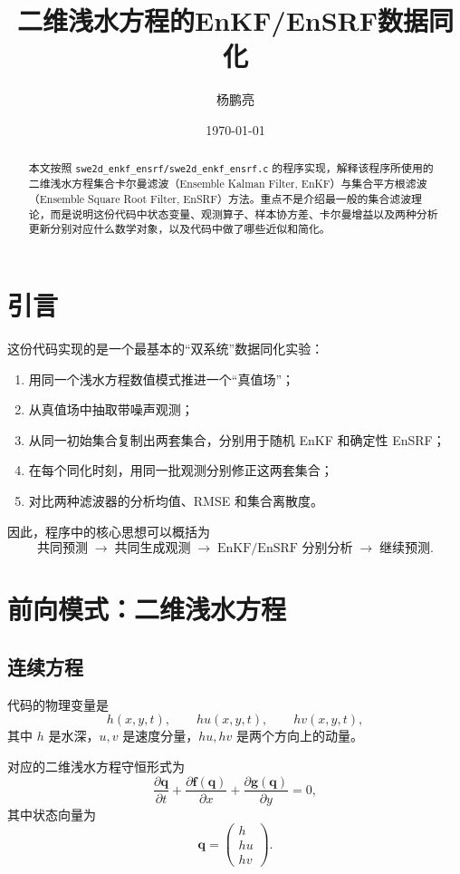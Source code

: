 \documentclass[12pt,a4paper]{article}
\title{二维浅水方程的EnKF/EnSRF数据同化}
\author{杨鹏亮}
\date{\today}
\begin{document}
\maketitle

\begin{abstract}
本文按照 \texttt{swe2d\_enkf\_ensrf/swe2d\_enkf\_ensrf.c} 的程序实现，解释该程序所使用的二维浅水方程集合卡尔曼滤波（Ensemble Kalman Filter, EnKF）与集合平方根滤波（Ensemble Square Root Filter, EnSRF）方法。重点不是介绍最一般的集合滤波理论，而是说明这份代码中状态变量、观测算子、样本协方差、卡尔曼增益以及两种分析更新分别对应什么数学对象，以及代码中做了哪些近似和简化。
\end{abstract}

\tableofcontents

\section{引言}

这份代码实现的是一个最基本的“双系统”数据同化实验：
\begin{enumerate}
    \item 用同一个浅水方程数值模式推进一个“真值场”；
    \item 从真值场中抽取带噪声观测；
    \item 从同一初始集合复制出两套集合，分别用于随机 EnKF 和确定性 EnSRF；
    \item 在每个同化时刻，用同一批观测分别修正这两套集合；
    \item 对比两种滤波器的分析均值、RMSE 和集合离散度。
\end{enumerate}

因此，程序中的核心思想可以概括为
\[
\text{共同预测} \;\to\; \text{共同生成观测} \;\to\; \text{EnKF/EnSRF 分别分析} \;\to\; \text{继续预测}.
\]

\section{前向模式：二维浅水方程}

\subsection{连续方程}

代码的物理变量是
\[
h(x,y,t), \qquad hu(x,y,t), \qquad hv(x,y,t),
\]
其中 $h$ 是水深，$u,v$ 是速度分量，$hu,hv$ 是两个方向上的动量。

对应的二维浅水方程守恒形式为
\[
\frac{\partial \mathbf{q}}{\partial t}
+ \frac{\partial \mathbf{f}(\mathbf{q})}{\partial x}
+ \frac{\partial \mathbf{g}(\mathbf{q})}{\partial y}
= 0,
\]
其中状态向量为
\[
\mathbf{q} =
\begin{pmatrix}
h \\ hu \\ hv
\end{pmatrix}.
\]
\end{document}
